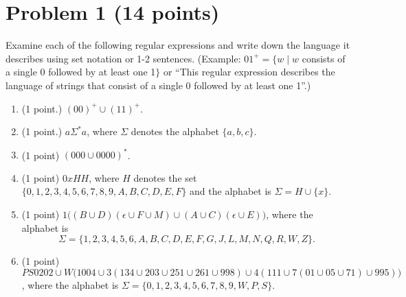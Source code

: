 \documentclass{../homework}
\begin{document}
\clearpage
\section{Problem 1 (14 points)}

Examine each of the following regular expressions and write down the language it describes using set notation or 1-2 sentences. (Example: $01^+ = \{w \; | \; w $ consists of a single 0 followed by at least one 1$\}$ or ``This regular expression describes the language of strings that consist of a single 0 followed by at least one 1''.)

\begin{enumerate}
    \item (1 point.) $(00)^+ \cup (11)^+$.
    
    \item (1 point.) $a\Sigma^*a$, where $\Sigma$ denotes the alphabet $\{a, b, c\}$.
    
    \item (1 point) $(000 \cup 0000)^*$.
    
    \item (1 point) $0xHH$, where $H$ denotes the set $\{0, 1, 2, 3, 4, 5, 6, 7, 8, 9, A, B, C, D, E, F\}$ and the alphabet is $\Sigma = H \cup \{x\}$.
    
    \item (1 point) $1\big((B \cup D)(\epsilon \cup F \cup M) \cup (A \cup C)(\epsilon \cup E)\big)$, where the alphabet is 
    \[
        \Sigma = \{1, 2, 3, 4, 5, 6, A, B, C, D, E, F, G, J, L, M, N, Q, R, W, Z\}.
    \]
    
    \item (1 point) $PS0202 \cup W\big(1004 \cup 3(134 \cup 203 \cup 251 \cup 261 \cup 998) \cup 4(111 \cup 7(01 \cup 05 \cup 71) \cup 995))$, where the alphabet is $\Sigma = \{0, 1, 2, 3, 4, 5, 6, 7, 8, 9, W, P, S\}$.

\end{enumerate}
\end{document}
